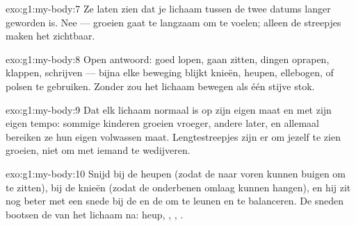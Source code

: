 \begin{solution}{exo:g1:my-body:7}
Ze laten zien dat je lichaam tussen de twee datums langer geworden is.
Nee --- groeien gaat te langzaam om te voelen; alleen de streepjes
maken het zichtbaar.
\end{solution}

\begin{solution}{exo:g1:my-body:8}
Open antwoord: goed lopen, gaan zitten, dingen oprapen, klappen,
schrijven --- bijna elke beweging blijkt knieën, heupen, ellebogen,
 of polsen te gebruiken. Zonder  zou het lichaam
bewegen als één stijve stok.
\end{solution}

\begin{solution}{exo:g1:my-body:9}
Dat elk lichaam normaal is op zijn eigen maat en met zijn eigen
tempo: sommige kinderen groeien vroeger, andere later, en allemaal
bereiken ze hun eigen volwassen maat. Lengtestreepjes zijn er om
jezelf te zien groeien, niet om met iemand te wedijveren.
\end{solution}

\begin{solution}{exo:g1:my-body:10}
Snijd bij de heupen (zodat de  naar voren kunnen buigen om te
zitten), bij de knieën (zodat de onderbenen omlaag kunnen hangen), en
hij zit nog beter met een snede bij de  en de  om te
leunen en te balanceren. De sneden bootsen de  van het
lichaam na: heup, , , .
\end{solution}
